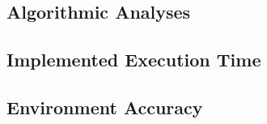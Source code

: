 \subsection{Algorithmic Analyses}

\subsection{Implemented Executi{}on Time}
\subsection{Environment Accuracy}